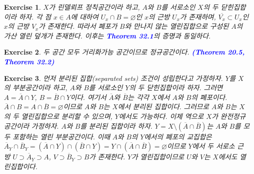 \documentclass{article}
\newtheorem{exercise}{Exercise}[section]
\begin{document}
\begin{exercise}
    $X$가 린델뢰프 정칙공간이라 하고, $A$와 $B$를 서로소인 $X$의 두 닫힌집합이라 하자. 각 점 $x\in A$에 대하여 $U_x\cap B=\varnothing$인 $x$의 근방 $U_x$가 존재하며, $\overline{V_x}\subset U_x$인 $x$의 근방 $V_x$가 존재한다. 따라서 폐포가 $B$와 만나지 않는 열린집합으로 구성된 $A$의 가산 열린 덮개가 존재한다. 이후는 \textcolor{blue}{\textbf{Theorem 32.1}}의 증명과 동일하다.
\end{exercise}

\begin{exercise}
    두 공간 모두 거리화가능 공간이므로 정규공간이다. \textcolor{blue}{\textbf{(Theorem 20.5, Theorem 32.2)}}
\end{exercise}

\begin{exercise}
    먼저 분리된 집합(separated sets) 조건이 성립한다고 가정하자. $Y$를 $X$의 부분공간이라 하고, $A$와 $B$를 서로소인 $Y$의 두 닫힌집합이라 하자. 그러면 $A=\overline{A}\cap Y$, $B=\overline{B}\cap Y$이다. 여기서 $\overline{A}$와 $\overline{B}$는 각각 $X$에서 $A$와 $B$의 폐포이다. $\overline{A}\cap B=A\cap\overline{B}=\varnothing$이므로 $A$와 $B$는 $X$에서 분리된 집합이다. 그러므로 $A$와 $B$는 $X$의 두 열린집합으로 분리할 수 있으며, $Y$에서도 가능하다. 이제 역으로 $X$가 완전정규공간이라 가정하자. $A$와 $B$를 분리된 집합이라 하자. $Y=X\setminus(\overline{A}\cap\overline{B})$는 $A$와 $B$를 모두 포함하는 열린 부분공간이다. 이때 $A$와 $B$의 $Y$에서의 폐포의 교집합은 $\overline{A}_Y\cap\overline{B}_Y=(\overline{A}\cap Y)\cap(\overline{B}\cap Y)=Y\cap(\overline{A}\cap\overline{B})=\varnothing$이므로 $Y$에서 두 서로소 근방 $U\supset\overline{A}_Y\supset A$, $V\supset\overline{B}_Y\supset B$가 존재한다. $Y$가 열린집합이므로 $U$와 $V$는 $X$에서도 열린집합이다.
\end{exercise}
\end{document}
